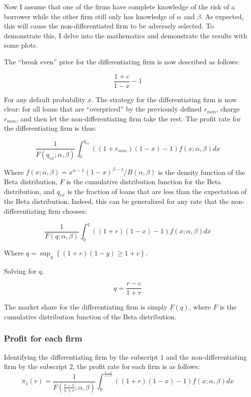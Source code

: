 \documentclass{article}
\theoremstyle{definition}
\begin{document}
Now I assume that one of the firms have complete knowledge of the risk of a borrower while the other firm still only has knowledge of \(\alpha\) and \(\beta\).   As expected, this will cause the non-differentiated firm to be adversely selected.  To demonstrate this, I delve into the mathematics and demonstrate the results with some plots.

The ``break even'' price for the differentiating firm is now described as follows:

\[\frac{1+c}{1-x}-1\]

For any default probability \(x\).  The strategy for the differentiating firm is now clear: for all loans that are ``overpriced'' by the previously defined \(r_{min}\), charge \(r_{min}\), and then let the non-differentiating firm take the rest.  The profit rate for the differentiating firm is thus:

\[\frac{1}{F(q_{ex};\alpha,\beta)}\int_0^{q_{ex}} \left((1+r_{min})(1-x)-1\right) f(x;\alpha,\beta)dx\]

Where \(f(x;\alpha,\beta)=x^{\alpha-1}(1-x)^{\beta-1} /B(\alpha, \beta)\) is the density function of the Beta distribution, \(F\) is the cumulative distribution function for the Beta distribution, and \(q_{ex}\) is the fraction of loans that are less than the expectation of the Beta distribution.  Indeed, this can be generalized for any rate that the non-differentiating firm chooses:

\[\frac{1}{F(q;\alpha,\beta)}\int_0^q \left((1+r)(1-x)-1\right) f(x;\alpha,\beta)dx\]

Where \(q = \sup_y \left\{ (1+r)(1-y) \geq 1+c\right\} \). 

Solving for \(q\), 

\[q=\frac{r-c}{1+r}\]

The market share for the differentiating firm is simply \(F(q)\), where \(F\) is the cumulative distribution function of the Beta distribution.

\subsubsection{Profit for each firm}
Identifying the differentiating firm by the subscript \(1\) and the non-differentiating firm by the subscript \(2\), the profit rate for each firm is as follows:
\begin{equation}
\pi_1(r)=\frac{1}{F\left(\frac{r-c}{1+r};\alpha,\beta\right)}\int_0^{\frac{r-c}{1+r}} \left((1+r)(1-x)-1\right) f(x;\alpha,\beta)dx
\end{equation}
\end{document}
